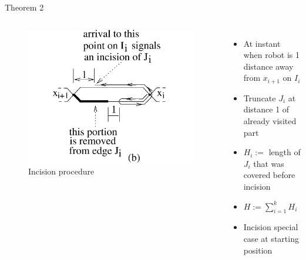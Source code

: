 \documentclass{beamer}
\begin{document}
\begin{frame}{Theorem 2}
    \begin{columns}
        \begin{figure}
            \includegraphics[width=0.8\linewidth]{Images/fig13b.png}
            \caption{Incision procedure}
        \end{figure}
        \begin{itemize}
            \item At instant when robot is 1 distance away from $x_{i+1}$ on $I_i$
            \item Truncate $J_i$ at distance 1 of already visited part
            \item $H_i := $ length of $J_i$ that was covered before incision
            \item $H := \sum_{i = 1}^{k} H_i$
            \item Incision special case at starting position
        \end{itemize}
    \end{columns}
\end{frame}
\end{document}
